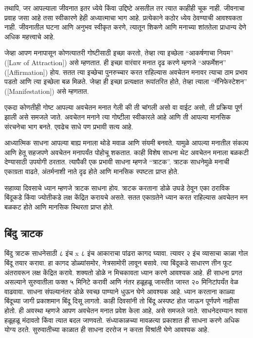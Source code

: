 तथापि, जर आपल्याला जीवनात इतर ध्येये किंवा उद्दिष्टे असतील तर त्यात काहीही चूक नाही. जीवनाचा प्रवाह जसा आहे तसा स्वीकारणे हेही अध्यात्माचा भाग आहे. प्रत्येकाने कठोर ध्येय ठेवण्याची आवश्यकता नाही. जीवनातील घटना आणि अनुभव स्वीकृत करणे, त्यातून शिकणे आणि मनाच्या शांततेला प्राधान्य देणे अधिक महत्त्वाचे आहे.

जेव्हा आपण मनापासून कोणत्यातरी गोष्टीसाठी इच्छा करतो, तेव्हा त्या इच्छेला “आकर्षणाचा नियम” ([Law of Attraction]) असे म्हणतात. ही इच्छा वारंवार मनात दृढ करणे म्हणजे “अफर्मेशन” ([Affirmation]) होय. सतत त्या इच्छेचा पुनरुच्चार करत राहिल्यास अवचेतन मनावर त्याचा ठाम प्रभाव पडतो आणि त्या इच्छेला बळ मिळते. जेव्हा ही इच्छा प्रत्यक्षात रूपांतरित होते, तेव्हा त्याला “मॅनिफेस्टेशन” ([Manifestation]) असे म्हणतात.

एकदा कोणतीही गोष्ट आपल्या अवचेतन मनात गेली की ती चांगली असो वा वाईट असो, ती प्रक्रिया पूर्ण झाली असे समजले जाते. अवचेतन मनाने त्या गोष्टीला स्वीकारले आहे आणि ती आपल्या मानसिक संरचनेचा भाग बनते. एवढेच साधे पण प्रभावी सत्य आहे.

आध्यात्मिक साधना आपल्या बाह्य मनाला थोडे मवाळ आणि संयमी बनवते. यामुळे आपल्या मनातील संकल्प आणि हेतू सहजपणे अवचेतन मनापर्यंत पोहोचू शकतात. काही विशेष साधना थेट अवचेतन मनाला बळकटी देण्यासाठी उपयोगी ठरतात. त्यापैकी एक प्रभावी साधना म्हणजे “त्राटक”. त्राटक साधनेमुळे मनाची एकाग्रता वाढते, अंतर्मनाशी नाते दृढ होते आणि मानसिक स्पष्टता प्राप्त होते.

सहाव्या दिवसाचे ध्यान म्हणजे त्राटक साधना होय. त्राटक करताना डोळे उघडे ठेवून एका ठराविक बिंदूकडे किंवा ज्योतीकडे लक्ष केंद्रित करायचे असते. सतत एकाग्रतेने ध्यान करत राहिल्यास अवचेतन मन बळकट होते आणि मानसिक स्थिरता प्राप्त होते.

\subsection*{बिंदु त्राटक}
बिंदु त्राटक साधनेसाठी ८ इंच x ८ इंच आकाराचा पांढरा कागद घ्यावा. त्यावर २ इंच व्यासाचा काळा गोल बिंदू तयार करावा. हा कागद डोळ्यांसमोर, नेत्रसामोरी लावून बसावे. त्या बिंदूकडे साधारण तीन फूट अंतरावरून लक्ष केंद्रित करावे. शक्यतो डोळे न मिचकावता ध्यान करणे आवश्यक आहे. ही साधना प्रगत असल्याने सुरुवातीला फक्त ५ मिनिटे करावी आणि नंतर हळूहळू जास्तीत जास्त २० मिनिटांपर्यंत वेळ वाढवावा. साधना संपल्यानंतर डोळे स्वच्छ पाण्याने धुऊन घेणे आवश्यक आहे. ध्यान करताना काळ्या बिंदूच्या जागी प्रकाशमान बिंदू दिसू लागतो. काही दिवसांनी तो बिंदू अस्पष्ट होत जाऊन पूर्णपणे नाहीसा होतो. ही अवस्था म्हणजे आपण अवचेतन मनात प्रवेश केला आहे, असे समजले जाते. साधनेदरम्यान श्वास हळूहळू मंदावतो किंवा त्यात बदल जाणवतो. संध्याकाळच्या मावळत्या प्रकाशात ही साधना करणे अधिक योग्य ठरते. सुरुवातीच्या काळात ही साधना दररोज न करता विश्रांती घेणे आवश्यक आहे.

